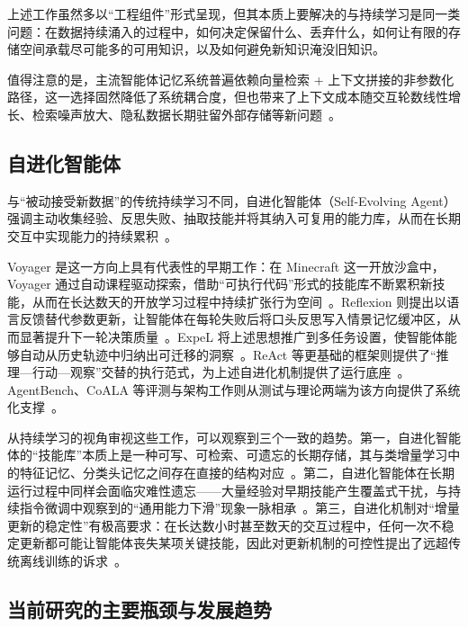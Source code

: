 上述工作虽然多以“工程组件”形式呈现，但其本质上要解决的与持续学习是同一类问题：在数据持续涌入的过程中，如何决定保留什么、丢弃什么，如何让有限的存储空间承载尽可能多的可用知识，以及如何避免新知识淹没旧知识。

值得注意的是，主流智能体记忆系统普遍依赖向量检索 + 上下文拼接的非参数化路径，这一选择固然降低了系统耦合度，但也带来了上下文成本随交互轮数线性增长、检索噪声放大、隐私数据长期驻留外部存储等新问题~\citep{packer2023memgpt,chhikara2025mem0}。

\subsection{自进化智能体}

与“被动接受新数据”的传统持续学习不同，自进化智能体（Self-Evolving Agent）强调主动收集经验、反思失败、抽取技能并将其纳入可复用的能力库，从而在长期交互中实现能力的持续累积~\citep{fan2025selfevolving,gao2025selfevolving}。

Voyager 是这一方向上具有代表性的早期工作：在 Minecraft 这一开放沙盒中，Voyager 通过自动课程驱动探索，借助“可执行代码”形式的技能库不断累积新技能，从而在长达数天的开放学习过程中持续扩张行为空间~\citep{wang2023voyager}。Reflexion 则提出以语言反馈替代参数更新，让智能体在每轮失败后将口头反思写入情景记忆缓冲区，从而显著提升下一轮决策质量~\citep{shinn2023reflexion}。ExpeL 将上述思想推广到多任务设置，使智能体能够自动从历史轨迹中归纳出可迁移的洞察~\citep{zhao2024expel}。ReAct 等更基础的框架则提供了“推理—行动—观察”交替的执行范式，为上述自进化机制提供了运行底座~\citep{yao2023react}。AgentBench、CoALA 等评测与架构工作则从测试与理论两端为该方向提供了系统化支撑~\citep{liu2024agentbench,sumers2024coala}。

从持续学习的视角审视这些工作，可以观察到三个一致的趋势。第一，自进化智能体的“技能库”本质上是一种可写、可检索、可遗忘的长期存储，其与类增量学习中的特征记忆、分类头记忆之间存在直接的结构对应~\citep{wang2023voyager,sumers2024coala,zhuang2022acil}。第二，自进化智能体在长期运行过程中同样会面临灾难性遗忘——大量经验对早期技能产生覆盖式干扰，与持续指令微调中观察到的“通用能力下滑”现象一脉相承~\citep{wang2024trace,luo2023empirical,shi2024llmcontinual}。第三，自进化机制对“增量更新的稳定性”有极高要求：在长达数小时甚至数天的交互过程中，任何一次不稳定更新都可能让智能体丧失某项关键技能，因此对更新机制的可控性提出了远超传统离线训练的诉求~\citep{fan2025selfevolving,gao2025selfevolving}。


\subsection{当前研究的主要瓶颈与发展趋势}

